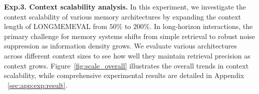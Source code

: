  \textbf{Exp.3. Context scalability analysis.}\label{exp3}
In this experiment, we investigate the context scalability of various memory architectures by expanding the context length of LONGMEMEVAL from $50\%$ to $200\%$. In long-horizon interactions, the primary challenge for memory systems shifts from simple retrieval to robust noise suppression as information density grows. 
We evaluate various architectures across different context sizes to see how well they maintain retrieval precision as context grows.
Figure~\ref{fig:scale_overall} illustrates the overall trends in context scalability, while comprehensive experimental results are detailed in Appendix ~\ref{sec:app:exp:result}.



